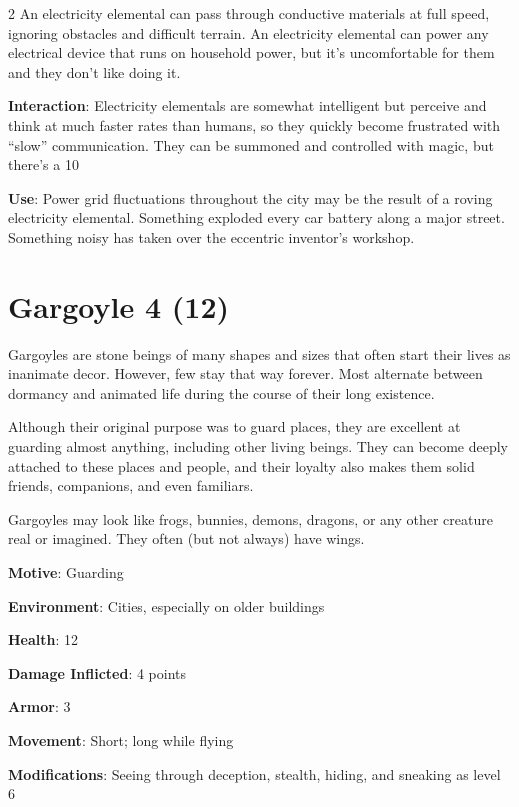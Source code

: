 \begin{multicols}{2}
An electricity elemental can pass through conductive materials at full speed, ignoring obstacles and difficult terrain. An electricity elemental can power any electrical device that runs on household power, but it’s uncomfortable for them and they don’t like doing it.

\textbf{Interaction}: Electricity elementals are somewhat intelligent but perceive and think at much faster rates than humans, so they quickly become frustrated with “slow” communication. They can be summoned and controlled with magic, but there’s a 10%

\textbf{Use}: Power grid fluctuations throughout the city may be the result of a roving electricity elemental. Something exploded every car battery along a major street. Something noisy has taken over the eccentric inventor’s workshop.

\section{Gargoyle 4 (12)}

Gargoyles are stone beings of many shapes and sizes that often start their lives as inanimate decor. However, few stay that way forever. Most alternate between dormancy and animated life during the course of their long existence. 

Although their original purpose was to guard places, they are excellent at guarding almost anything, including other living beings. They can become deeply attached to these places and people, and their loyalty also makes them solid friends, companions, and even familiars. 

Gargoyles may look like frogs, bunnies, demons, dragons, or any other creature real or imagined. They often (but not always) have wings.

\textbf{Motive}: Guarding 

\textbf{Environment}: Cities, especially on older buildings 

\textbf{Health}: 12 

\textbf{Damage Inflicted}: 4 points 

\textbf{Armor}: 3 

\textbf{Movement}: Short; long while flying 

\textbf{Modifications}: Seeing through deception, stealth, hiding, and sneaking as level 6 


\end{multicols}
